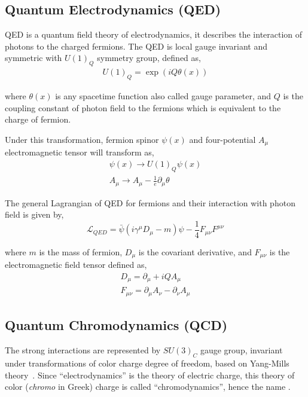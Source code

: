 \subsection{
  Quantum Electrodynamics (QED)
}\label{ch_intro:qed}

\gls{QED} is a quantum field theory of electrodynamics, it describes
the interaction of photons to the charged fermions.
The \gls{QED} is local gauge invariant and symmetric with \( {U(1)}_{Q} \) symmetry group,
defined as,
%
\begin{align}
  {U(1)}_{Q} = \exp\left( { i Q \theta (x) } \right)
\end{align}

where \( \theta (x) \) is any spacetime function also called gauge parameter,
and \( Q \) is the coupling constant of photon field to the fermions
which is equivalent to the charge of fermion.

Under this transformation, fermion spinor \( \psi (x) \) and
four-potential \( A_{\mu} \) electromagnetic tensor will transform
as,
%
\begin{align}
  \psi (x) \rightarrow {U(1)}_{Q} \psi (x) \\
  A_{\mu} \rightarrow A_{\mu} - \frac{1}{e} \partial_{\mu} \theta
\end{align}

The general Lagrangian of \gls{QED} for fermions and their interaction
with photon field is given by,
%
\begin{equation}\label{eq:lag-qed}
  {\mathcal{L}}_{QED} = \bar{\psi} ( i {\gamma}^{\mu} {D}_{\mu} - m ) \psi
  - \frac{1}{4} {F}_{\mu \nu} {F}^{\mu \nu}
\end{equation}

where \( m \) is the mass of fermion,
\( {D}_{\mu} \) is the covariant derivative,
and \( {F}_{\mu \nu} \) is the electromagnetic field tensor defined as,
%
\begin{align}
  {D}_{\mu} = \partial_{\mu} + i Q A_{\mu} \\
  {F}_{\mu \nu} = \partial_{\mu} A_{\nu} - \partial_{\nu} A_{\mu}
\end{align}

\subsection{
  Quantum Chromodynamics (QCD)
}\label{ch_intro:qcd}

The strong interactions are represented by \( {SU(3)}_{C} \) gauge group, invariant
under transformations of color charge degree of freedom, based
on Yang-Mills theory~\cite{Yang-Mill:1954}. Since ``electrodynamics''
is the theory of electric charge, this theory of color (\textit{chromo} in Greek)
charge is called ``chromodynamics'', hence the name .

